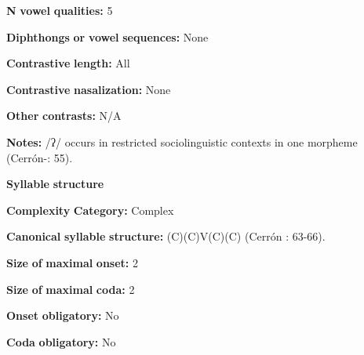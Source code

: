 \documentclass[output=paper]{langsci/langscibook}
\begin{document}
\begin{styleBody}
\textbf{N} \textbf{vowel} \textbf{qualities:} 5
\end{styleBody}

\begin{styleBody}
\textbf{Diphthongs} \textbf{or} \textbf{vowel} \textbf{sequences:} None
\end{styleBody}

\begin{styleBody}
\textbf{Contrastive} \textbf{length:} All
\end{styleBody}

\begin{styleBody}
\textbf{Contrastive} \textbf{nasalization:} None
\end{styleBody}

\begin{styleBody}
\textbf{Other} \textbf{contrasts:} N/A
\end{styleBody}

\begin{styleBody}
\textbf{Notes:} /ʔ/ occurs in restricted sociolinguistic contexts in one morpheme (Cerrón-\citealt{Palomino2006}: 55).
\end{styleBody}

\begin{styleBody}
\textbf{Syllable} \textbf{structure}
\end{styleBody}

\begin{styleBody}
\textbf{Complexity} \textbf{Category:} Complex
\end{styleBody}

\begin{styleBody}
\textbf{Canonical} \textbf{syllable} \textbf{structure:} (C)(C)V(C)(C) (Cerrón \citealt{Palomino2006}: 63-66).
\end{styleBody}

\begin{styleBody}
\textbf{Size} \textbf{of} \textbf{maximal} \textbf{onset:} 2
\end{styleBody}

\begin{styleBody}
\textbf{Size} \textbf{of} \textbf{maximal} \textbf{coda:} 2
\end{styleBody}

\begin{styleBody}
\textbf{Onset} \textbf{obligatory:} No
\end{styleBody}

\begin{styleBody}
\textbf{Coda} \textbf{obligatory:} No
\end{styleBody}
\end{document}
